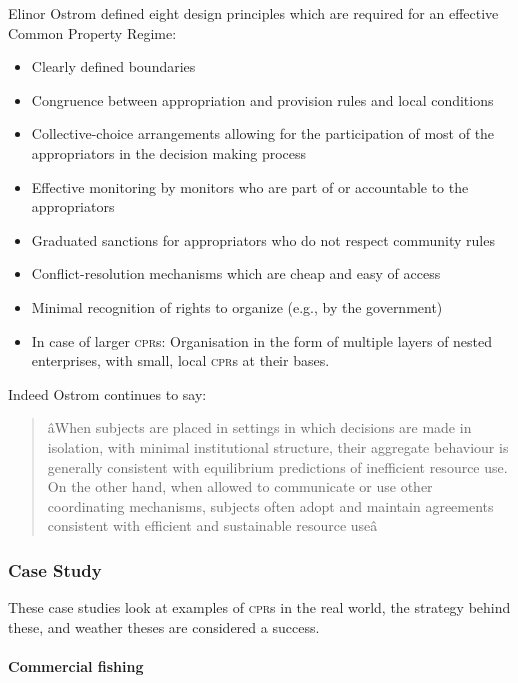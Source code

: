 Elinor Ostrom defined eight design principles which are required for an effective Common Property Regime:~\cite{Ostrom-90}

\begin{itemize}
	\item Clearly defined boundaries
	\item Congruence between appropriation and provision rules and local conditions
	\item Collective-choice arrangements allowing for the participation of most of the appropriators in the decision making process
	\item Effective monitoring by monitors who are part of or accountable to the appropriators
	\item Graduated sanctions for appropriators who do not respect community rules
	\item Conflict-resolution mechanisms which are cheap and easy of access
	\item Minimal recognition of rights to organize (e.g., by the government)
	\item In case of larger \textsc{cpr}s: Organisation in the form of multiple layers of nested enterprises, with small, local \textsc{cpr}s at their bases.
\end{itemize}

Indeed Ostrom continues to say:

\begin{quote}
	âWhen subjects are placed in settings in which decisions are made in isolation, with minimal institutional structure, their aggregate behaviour is generally consistent with equilibrium predictions of inefficient resource use. On the other hand, when allowed to communicate or use other coordinating mechanisms, subjects often adopt and maintain agreements consistent with efficient and sustainable resource useâ~\cite{Ostrom-rules}
\end{quote}

\subsubsection{Case Study}

These case studies look at examples of \textsc{cpr}s in the real world, the strategy behind these, and weather theses are considered a success.

\paragraph{Commercial fishing}

